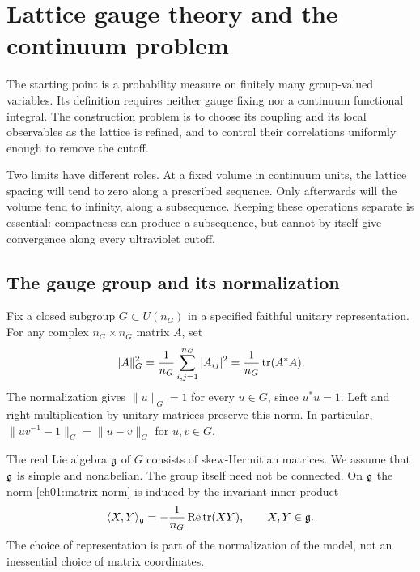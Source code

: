\chapter{Lattice gauge theory and the continuum problem}
\label{ch01:lattice}

The starting point is a probability measure on finitely many group-valued
variables. Its definition requires neither gauge fixing nor a continuum
functional integral. The construction problem is to choose its coupling and
its local observables as the lattice is refined, and to control their
correlations uniformly enough to remove the cutoff.

Two limits have different roles. At a fixed volume in continuum units, the lattice
spacing will tend to zero along a prescribed sequence. Only afterwards will
the volume tend to infinity, along a subsequence. Keeping these operations
separate is essential: compactness can produce a subsequence, but cannot by
itself give convergence along every ultraviolet cutoff.

\section{The gauge group and its normalization}
\label{ch01:gauge}

Fix a closed subgroup $G\subset U(n_G)$ in a specified faithful unitary
representation. For any complex $n_G\times n_G$ matrix $A$, set
\begin{equation}
 \|A\|_G^2=\frac{1}{n_G}\sum_{i,j=1}^{n_G}|A_{ij}|^2
          =\frac{1}{n_G}\operatorname{tr}(A^*A).
 \label{ch01:matrix-norm}
\end{equation}
The normalization gives $\|u\|_G=1$ for every $u\in G$, since $u^*u=1$.
Left and right multiplication by unitary matrices preserve this norm.
In particular, $\|uv^{-1}-1\|_G=\|u-v\|_G$ for $u,v\in G$.

The real Lie algebra $\mathfrak g$ of $G$ consists of skew-Hermitian matrices.
We assume that $\mathfrak g$ is simple and nonabelian. The group itself need
not be connected. On $\mathfrak g$ the norm \eqref{ch01:matrix-norm} is induced
by the invariant inner product
\begin{equation}
 \langle X,Y\rangle_{\mathfrak g}=-\frac1{n_G}\operatorname{Re}\operatorname{tr}(XY),
 \qquad X,Y\in\mathfrak g.
 \label{ch01:metric}
\end{equation}
The choice of representation is part of the normalization of the model,
not an inessential choice of matrix coordinates.

